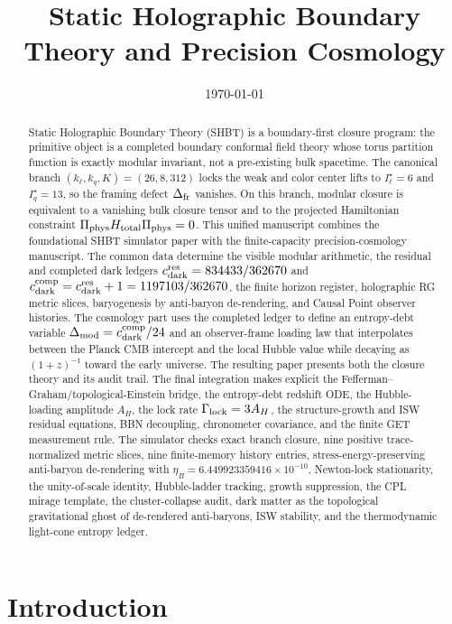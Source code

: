 \documentclass[11pt]{article}
\title{Static Holographic Boundary Theory and Precision Cosmology}
\author{}
\date{\today}
\newcommand{\kell}{k_{\ell}}
\newcommand{\kq}{k_q}
\newcommand{\Kpar}{K}
\newcommand{\Deltafr}{\Delta_{\rm fr}}
\newcommand{\cdarkres}{c_{\rm dark}^{\rm res}}
\newcommand{\cdarkcomp}{c_{\rm dark}^{\rm comp}}
\newcommand{\Htotal}{H_{\rm total}}
\newcommand{\DeltaMod}{\Delta_{\rm mod}}
\newcommand{\GammaLock}{\Gamma_{\rm lock}}
\newcommand{\AH}{A_H}
\begin{document}
\maketitle

\begin{abstract}
Static Holographic Boundary Theory (SHBT) is a boundary-first closure program:
the primitive object is a completed boundary conformal field theory whose torus
partition function is exactly modular invariant, not a pre-existing bulk
spacetime. The canonical branch
$(\kell,\kq,\Kpar)=(26,8,312)$ locks the weak and color center lifts to
$I_{\ell}^{\star}=6$ and $I_q^{\star}=13$, so the framing defect
$\Deltafr$ vanishes. On this branch, modular closure is equivalent to a
vanishing bulk closure tensor and to the projected Hamiltonian constraint
$\Pi_{\rm phys}\Htotal\Pi_{\rm phys}=0$.
This unified manuscript combines the foundational SHBT simulator paper with the
finite-capacity precision-cosmology manuscript. The common data determine the
visible modular arithmetic, the residual and completed dark ledgers
$\cdarkres=834433/362670$ and
$\cdarkcomp=\cdarkres+1=1197103/362670$, the finite horizon register,
holographic RG metric slices, baryogenesis by anti-baryon de-rendering, and
Causal Point observer histories. The cosmology part uses the completed ledger
to define an entropy-debt variable
$\DeltaMod=\cdarkcomp/24$ and an observer-frame loading law that interpolates
between the Planck CMB intercept and the local Hubble value while decaying as
$(1+z)^{-1}$ toward the early universe.
The resulting paper presents both the closure theory and its audit trail. The
final integration makes explicit the Fefferman--Graham/topological-Einstein
bridge, the entropy-debt redshift ODE, the Hubble-loading amplitude
\(\AH\), the lock rate \(\GammaLock=3\AH\), the structure-growth and ISW
residual equations, BBN decoupling, chronometer covariance, and the finite GET
measurement rule. The simulator checks exact branch closure, nine positive
trace-normalized metric slices, nine finite-memory history entries,
stress-energy-preserving anti-baryon de-rendering with
$\eta_B=6.449923359416\times10^{-10}$, Newton-lock stationarity, the
unity-of-scale identity, Hubble-ladder tracking, growth suppression, the CPL
mirage template, the cluster-collapse audit, dark matter as the topological
gravitational ghost of de-rendered anti-baryons, ISW stability, and the
thermodynamic light-cone entropy ledger.
\end{abstract}

\section{Introduction}
\label{sec:introduction}
\end{document}
